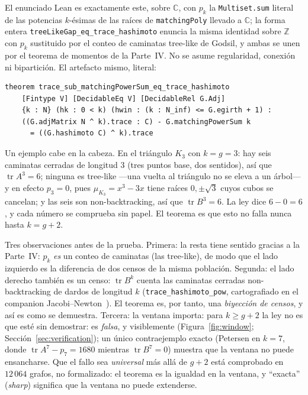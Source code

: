 \documentclass[11pt]{article}
\newcommand{\lean}[1]{\texttt{#1}}
\newcommand{\Z}{\mathbb{Z}}
\newcommand{\C}{\mathbb{C}}
\DeclareMathOperator{\tr}{tr}
\begin{document}
El enunciado Lean es exactamente este, sobre $\C$, con $p_k$ la \lean{Multiset.sum} literal
de las potencias $k$-ésimas de las raíces de \lean{matchingPoly} llevado a $\C$; la forma
entera \lean{treeLikeGap\_eq\_trace\_hashimoto} enuncia la misma identidad sobre $\Z$ con
$p_k$ sustituido por el conteo de caminatas tree-like de Godsil, y ambas se unen por el
teorema de momentos de la Parte~IV. No se asume regularidad, conexión ni bipartición. El
artefacto mismo, literal:
\begin{tcolorbox}[colframe=ggteal!70,colback=ggband!20,arc=3pt,boxrule=0.8pt]
\small\begin{verbatim}
theorem trace_sub_matchingPowerSum_eq_trace_hashimoto
    [Fintype V] [DecidableEq V] [DecidableRel G.Adj]
    {k : N} (hk : 0 < k) (hwin : (k : N_inf) <= G.egirth + 1) :
    ((G.adjMatrix N ^ k).trace : C) - G.matchingPowerSum k
      = ((G.hashimoto C) ^ k).trace
\end{verbatim}
\end{tcolorbox}

Un ejemplo cabe en la cabeza. En el triángulo $K_3$ con $k = g = 3$: hay seis caminatas
cerradas de longitud $3$ (tres puntos base, dos sentidos), así que $\tr A^3 = 6$; ninguna es
tree-like ---una vuelta al triángulo no se eleva a un árbol--- y en efecto $p_3 = 0$, pues
$\mu_{K_3} = x^3 - 3x$ tiene raíces $0, \pm\sqrt3$ cuyos cubos se cancelan; y las seis son
non-backtracking, así que $\tr B^3 = 6$. La ley dice $6 - 0 = 6$, y cada número se comprueba
sin papel. El teorema es que esto no falla nunca hasta $k = g+2$.

Tres observaciones antes de la prueba. Primera: la resta tiene sentido gracias a la
Parte~IV: $p_k$ \emph{es} un conteo de caminatas (las tree-like), de modo que el lado
izquierdo es la diferencia de dos censos de la misma población. Segunda: el lado derecho
también es un censo: $\tr B^k$ cuenta las caminatas cerradas non-backtracking de dardos de
longitud $k$ (\lean{trace\_hashimoto\_pow}, cartografiado en el companion
Jacobi--Newton~\cite{MarinJN2026}). El teorema es, por tanto, una \emph{biyección de
censos}, y así es como se demuestra. Tercera: la ventana importa: para $k \ge g+2$ la ley no
es que esté sin demostrar: es \emph{falsa}, y visiblemente
(Figura~\ref{fig:window}; Sección~\ref{sec:verification}); un único contraejemplo exacto
(Petersen en $k = 7$, donde $\tr A^7 - p_7 = 1680$ mientras $\tr B^7 = 0$) muestra que la
ventana no puede ensancharse. Que el fallo sea \emph{universal} más allá de $g+2$ está
comprobado en $12\,064$ grafos, no formalizado: el teorema es la igualdad en la ventana, y
``exacta'' (\emph{sharp}) significa que la ventana no puede extenderse.
\end{document}
